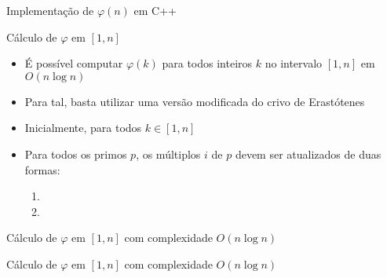 \begin{frame}[fragile]{Implementação de $\varphi(n)$ em C++}
\end{frame}

\begin{frame}[fragile]{Cálculo de $\varphi$ em $[1, n]$}

    \begin{itemize}
        \item É possível computar $\varphi(k)$ para todos inteiros $k$ no intervalo $[1, n]$ em $O(n\log n)$

        \item Para tal, basta utilizar uma versão modificada do crivo de Erastótenes

        \item Inicialmente,  para todos $k\in [1, n]$

        \item Para todos os primos $p$, os múltiplos $i$ de $p$ devem ser atualizados de duas formas:
        \begin{enumerate}
            \item {}
            \item {}
        \end{enumerate}
    \end{itemize}

\end{frame}

\begin{frame}[fragile]{Cálculo de $\varphi$ em $[1, n]$ com complexidade $O(n\log n)$}
\end{frame}

\begin{frame}[fragile]{Cálculo de $\varphi$ em $[1, n]$ com complexidade $O(n\log n)$}
\end{frame}
